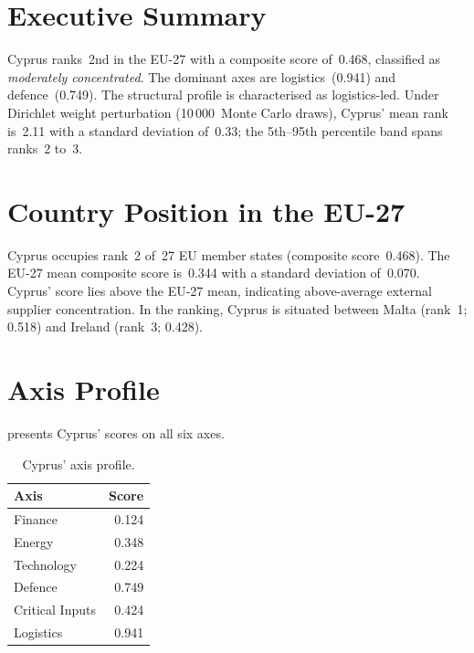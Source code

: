 \documentclass[12pt,a4paper]{article}
\begin{document}
\hypersetup{pageanchor=true}
\pagestyle{fancy}
\renewcommand{\headrulewidth}{0.4pt}


\section{Executive Summary}
\label{sec:summary}

Cyprus ranks~2nd in the EU-27 with a composite \ISI score of~0.468, classified as \emph{moderately concentrated}.  The dominant axes are logistics~(0.941) and defence~(0.749).  The structural profile is characterised as logistics-led.  Under Dirichlet weight perturbation (10\,000~Monte Carlo draws), Cyprus' mean rank is~2.11 with a standard deviation of~0.33; the 5th--95th percentile band spans ranks~2 to~3.


\section{Country Position in the EU-27}
\label{sec:position}

Cyprus occupies rank~2 of~27 EU member states (composite score~0.468).  The EU-27 mean composite score is~0.344 with a standard deviation of~0.070.  Cyprus' score lies above the EU-27 mean, indicating above-average external supplier concentration.  In the ranking, Cyprus is situated between Malta (rank~1; 0.518) and Ireland (rank~3; 0.428).


\section{Axis Profile}
\label{sec:axis-profile}

 presents Cyprus' scores on all six \ISI axes.

\begin{table}[htbp]
\centering\small
\caption{Cyprus' \ISI axis profile.}
\label{tab:axis-profile}
\begin{tabular}{@{}lr@{}}
\toprule
\textbf{Axis} & \textbf{Score} \\
\midrule
    Finance           & 0.124 \\
    Energy            & 0.348 \\
    Technology        & 0.224 \\
    Defence           & 0.749 \\
    Critical Inputs   & 0.424 \\
    Logistics         & 0.941 \\
\bottomrule
\end{tabular}
\end{table}
\end{document}

